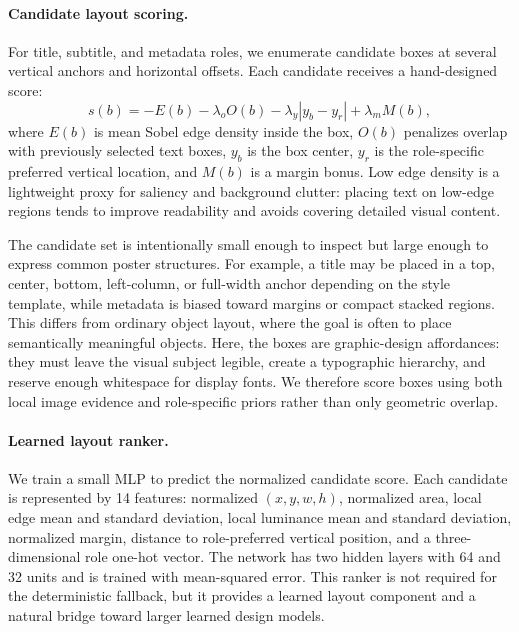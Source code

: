 \documentclass[10pt,twocolumn,letterpaper]{article}
\begin{document}
\paragraph{Candidate layout scoring.}
For title, subtitle, and metadata roles, we enumerate candidate boxes at several vertical anchors and horizontal offsets. Each candidate receives a hand-designed score:
\begin{equation}
s(b) = -E(b) - \lambda_o O(b) - \lambda_y |y_b - y_r| + \lambda_m M(b),
\end{equation}
where $E(b)$ is mean Sobel edge density inside the box, $O(b)$ penalizes overlap with previously selected text boxes, $y_b$ is the box center, $y_r$ is the role-specific preferred vertical location, and $M(b)$ is a margin bonus. Low edge density is a lightweight proxy for saliency and background clutter: placing text on low-edge regions tends to improve readability and avoids covering detailed visual content.

The candidate set is intentionally small enough to inspect but large enough to express common poster structures. For example, a title may be placed in a top, center, bottom, left-column, or full-width anchor depending on the style template, while metadata is biased toward margins or compact stacked regions. This differs from ordinary object layout, where the goal is often to place semantically meaningful objects. Here, the boxes are graphic-design affordances: they must leave the visual subject legible, create a typographic hierarchy, and reserve enough whitespace for display fonts. We therefore score boxes using both local image evidence and role-specific priors rather than only geometric overlap.

\paragraph{Learned layout ranker.}
We train a small MLP to predict the normalized candidate score. Each candidate is represented by 14 features: normalized $(x,y,w,h)$, normalized area, local edge mean and standard deviation, local luminance mean and standard deviation, normalized margin, distance to role-preferred vertical position, and a three-dimensional role one-hot vector. The network has two hidden layers with 64 and 32 units and is trained with mean-squared error. This ranker is not required for the deterministic fallback, but it provides a learned layout component and a natural bridge toward larger learned design models.
\end{document}
